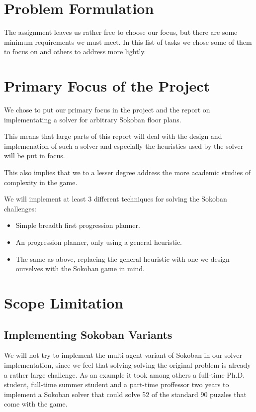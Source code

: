 \section{Problem Formulation}

The assignment leaves us rather free to choose our focus, but there are
some minimum requirements we must meet. In this list of tasks we chose
some of them to focus on and others to address more lightly.

\section{Primary Focus of the Project}
We chose to put our primary focus in the project and the report on
implementating a solver for arbitrary Sokoban floor plans.

This means that large parts of this report will deal with the design
and implemenation of such a solver and especially the heuristics used 
by the solver will be put in focus.

This also implies that we to a lesser degree address the more academic
studies of complexity in the game.

We will implement at least 3 different techniques for solving the
Sokoban challenges:
\begin{itemize}
\item Simple breadth first progression planner. %
\item An \astar progression planner, only using a general heuristic. %
\item The same as above, replacing the general heuristic with one we
  design ourselves with the Sokoban game in mind.
\end{itemize}



\section{Scope Limitation}
\label{sec:scope}
\subsection{Implementing Sokoban Variants}
We will not try to implement the multi-agent variant of Sokoban in our
solver implementation, since we feel that solving solving the original
problem is already a rather large challenge. As an example it took
among others a full-time Ph.D. student, full-time summer student and a
part-time proffessor two years to implement a Sokoban solver that
could solve 52 of the standard 90 puzzles that come with the
game. \citep{Junghanns99domain-dependentsingle-agent}

